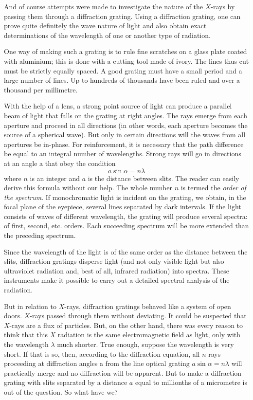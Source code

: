 And of course attempts were made to investigate the nature of the $X$-rays by passing them through a diffrac­tion grating. Using a diffraction grating, one can prove quite definitely the wave nature of light and also obtain exact determinations of the wavelength of one or another type of radiation.

One way of making such a grating is to rule fine scratches on a glass plate coated with aluminium; this is done with a cutting tool made of ivory. The lines thus cut must be strictly equally spaced. A good grating must have a small period and a large number of lines. Up to hundreds of thousands have been ruled and over a thou­sand per millimetre.

With the help of a lens, a strong point source of light can produce a parallel beam of light that falls on the grating at right angles. The rays emerge from each aper­ture and proceed in all directions (in other words, each aperture becomes the source of a spherical wave). But only in certain directions will the waves from all apertures be in-phase. For reinforcement, it is necessary that the path difference be equal to an integral number of wavelengths. Strong rays will go in directions at an angle a that obey the condition 
\begin{equation*}%
a \sin \alpha = n \lambda
\end{equation*}
where $n$ is an integer and $a$ is the distance between slits. The reader can easily derive this formula without our help. The whole number $n$ is termed the \emph{order of the spec­trum}. If monochromatic light is incident on the grating, we obtain, in the focal plane of the eyepiece, several lines separated by dark intervals. If the light consists of waves of different wavelength, the grating will produce several spectra: of first, second, etc. orders. Each suc­ceeding spectrum will be more extended than the pre­ceding spectrum.

Since the wavelength of the light is of the same order as the distance between the slits, diffraction gratings disperse light (and not only visible light but also ultraviolet radiation and, best of all, infrared radiation) into spectra. These instruments make it possible to carry out a detailed spectral analysis of the radiation.

But in relation to $X$-rays, diffraction gratings behaved like a system of open doors. $X$-rays passed through them without deviating. It could be suspected that $X$-rays are a flux of particles. But, on the other hand, there was every reason to think that this $X$ radiation is the same electromagnetic field as light, only with the wavelength $\lambda$ much shorter. True enough, suppose the wavelength is very short. If that is so, then, according to the diffraction equation, all $n$ rays proceeding at diffraction angles a from the line optical grating $a \sin \alpha =n \lambda$ will practically merge and no diffraction will be apparent. But to make a diffraction grating with slits separated by a distance $a$ equal to millionths of a micrometre is out of the ques­tion. So what have we?


